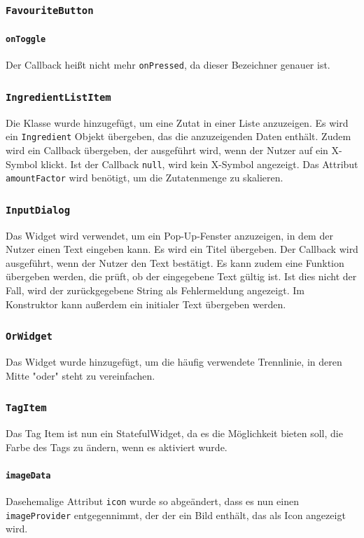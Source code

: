 \documentclass{implementierungsheft}
\begin{document}
\subsubsection*{\texttt{FavouriteButton}}
\paragraph{\texttt{onToggle}}
Der Callback heißt nicht mehr \texttt{onPressed}, da dieser Bezeichner genauer ist.
\subsubsection*{\texttt{IngredientListItem}}
Die Klasse wurde hinzugefügt, um eine Zutat in einer Liste anzuzeigen. Es wird ein \texttt{Ingredient} Objekt übergeben, das die anzuzeigenden Daten enthält. Zudem wird ein Callback übergeben, der ausgeführt wird, wenn der Nutzer auf ein X-Symbol klickt. Ist der Callback \texttt{null}, wird kein X-Symbol angezeigt. Das Attribut \texttt{amountFactor} wird benötigt, um die Zutatenmenge zu skalieren.
\subsubsection*{\texttt{InputDialog}}
Das Widget wird verwendet, um ein Pop-Up-Fenster anzuzeigen, in dem der Nutzer einen Text eingeben kann. Es wird ein Titel übergeben. Der Callback wird ausgeführt, wenn der Nutzer den Text bestätigt. Es kann zudem eine Funktion übergeben werden, die prüft, ob der eingegebene Text gültig ist. Ist dies nicht der Fall, wird der zurückgegebene String als Fehlermeldung angezeigt.
Im Konstruktor kann außerdem ein initialer Text übergeben werden.
\subsubsection*{\texttt{OrWidget}}
Das Widget wurde hinzugefügt, um die häufig verwendete Trennlinie, in deren Mitte "oder" steht zu vereinfachen.
\subsubsection*{\texttt{TagItem}}
Das Tag Item ist nun ein StatefulWidget, da es die Möglichkeit bieten soll, die Farbe des Tags zu ändern, wenn es aktiviert wurde. 
\paragraph*{\texttt{imageData}}
Dasehemalige Attribut \texttt{icon} wurde so abgeändert, dass es nun einen \texttt{imageProvider} entgegennimmt, der der ein Bild enthält, das als Icon angezeigt wird.
\end{document}
